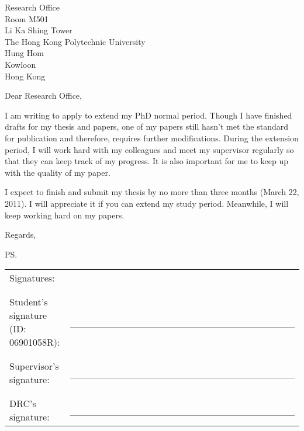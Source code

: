 \documentclass[a4paper]{letter}
\begin{document}
\signature{Steven Lai}
\address{Room QT405 \\ The Hong Kong Polytechnic University \\ Hung Hom \\ Kowloon \\ Hong Kong}

\begin{letter}{Research Office \\ Room M501 \\ Li Ka Shing Tower \\ The Hong Kong Polytechnic University \\ Hung Hom \\ Kowloon \\ Hong Kong}
\opening{Dear Research Office,}

I am writing to apply to extend my PhD normal period. Though I have finished drafts for my thesis and papers, one of my papers still hasn't met the standard for publication and therefore, requires further modifications. During the extension period, I will work hard with my colleagues and meet my supervisor regularly so that they can keep track of my progress. It is also important for me to keep up with the quality of my paper.

I expect to finish and submit my thesis by no more than three months (March 22, 2011). I will appreciate it if you can extend my study period. Meanwhile, I will keep working hard on my papers.

\closing{Regards,}
\ps{\begin{tabular}{  p{8cm}  p{6cm}  }
Signatures:\\\\\\
Student's signature (ID: 06901058R): & \_\_\_\_\_\_\_\_\_\_\_\_\_\_\_\_\_\_\_\_\_\_\_\_\_\_\_\_\_\_\_\_ \\\\\\
Supervisor's signature: & \_\_\_\_\_\_\_\_\_\_\_\_\_\_\_\_\_\_\_\_\_\_\_\_\_\_\_\_\_\_\_\_ \\\\\\
DRC's signature: & \_\_\_\_\_\_\_\_\_\_\_\_\_\_\_\_\_\_\_\_\_\_\_\_\_\_\_\_\_\_\_\_
\end{tabular}}

\end{letter}


%
\end{document}
